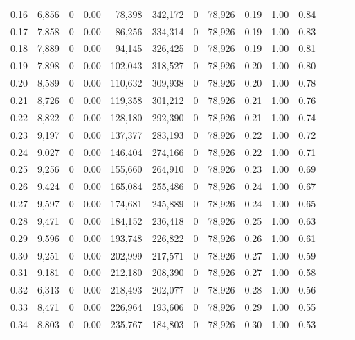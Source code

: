 \begin{tabular}{rrrrrrrrrrrrrr}
0.16 &  6,856 &      0 &  0.00 &   78,398 &  342,172 &       0 &  78,926 &  0.19 &  1.00 &      0.84 \\
0.17 &  7,858 &      0 &  0.00 &   86,256 &  334,314 &       0 &  78,926 &  0.19 &  1.00 &      0.83 \\
0.18 &  7,889 &      0 &  0.00 &   94,145 &  326,425 &       0 &  78,926 &  0.19 &  1.00 &      0.81 \\
0.19 &  7,898 &      0 &  0.00 &  102,043 &  318,527 &       0 &  78,926 &  0.20 &  1.00 &      0.80 \\
0.20 &  8,589 &      0 &  0.00 &  110,632 &  309,938 &       0 &  78,926 &  0.20 &  1.00 &      0.78 \\
0.21 &  8,726 &      0 &  0.00 &  119,358 &  301,212 &       0 &  78,926 &  0.21 &  1.00 &      0.76 \\
0.22 &  8,822 &      0 &  0.00 &  128,180 &  292,390 &       0 &  78,926 &  0.21 &  1.00 &      0.74 \\
0.23 &  9,197 &      0 &  0.00 &  137,377 &  283,193 &       0 &  78,926 &  0.22 &  1.00 &      0.72 \\
0.24 &  9,027 &      0 &  0.00 &  146,404 &  274,166 &       0 &  78,926 &  0.22 &  1.00 &      0.71 \\
0.25 &  9,256 &      0 &  0.00 &  155,660 &  264,910 &       0 &  78,926 &  0.23 &  1.00 &      0.69 \\
0.26 &  9,424 &      0 &  0.00 &  165,084 &  255,486 &       0 &  78,926 &  0.24 &  1.00 &      0.67 \\
0.27 &  9,597 &      0 &  0.00 &  174,681 &  245,889 &       0 &  78,926 &  0.24 &  1.00 &      0.65 \\
0.28 &  9,471 &      0 &  0.00 &  184,152 &  236,418 &       0 &  78,926 &  0.25 &  1.00 &      0.63 \\
0.29 &  9,596 &      0 &  0.00 &  193,748 &  226,822 &       0 &  78,926 &  0.26 &  1.00 &      0.61 \\
0.30 &  9,251 &      0 &  0.00 &  202,999 &  217,571 &       0 &  78,926 &  0.27 &  1.00 &      0.59 \\
0.31 &  9,181 &      0 &  0.00 &  212,180 &  208,390 &       0 &  78,926 &  0.27 &  1.00 &      0.58 \\
0.32 &  6,313 &      0 &  0.00 &  218,493 &  202,077 &       0 &  78,926 &  0.28 &  1.00 &      0.56 \\
0.33 &  8,471 &      0 &  0.00 &  226,964 &  193,606 &       0 &  78,926 &  0.29 &  1.00 &      0.55 \\
0.34 &  8,803 &      0 &  0.00 &  235,767 &  184,803 &       0 &  78,926 &  0.30 &  1.00 &      0.53 \\

\end{tabular}
